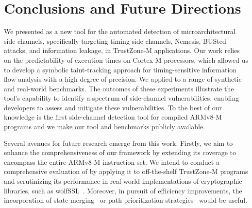 \section{Conclusions and Future Directions}

We presented \tool{} as a new tool for the automated detection of
microarchitectural side channels, specifically targeting timing side
channels, Nemesis, BUSted attacks, and information leakage, in TrustZone-M
applications. Our work relies on the predictability of execution times on
Cortex-M processors, which allowed us to develop a symbolic taint-tracking
approach for timing-sensitive information flow analysis with a high degree
of precision. We applied \tool{} to a range of synthetic and real-world
benchmarks. The outcomes of these experiments illustrate the tool's
capability to identify a spectrum of side-channel vulnerabilities, enabling
developers to assess and mitigate these vulnerabilities. To the best of our
knowledge \tool{} is the first side-channel detection tool for compiled
ARMv8-M programs and we make our tool and benchmarks publicly available.

Several avenues for future research emerge from this work. Firstly, we aim
to enhance the comprehensiveness of our framework by extending its coverage
to encompass the entire ARMv8-M instruction set. We intend to conduct a
comprehensive evaluation of \tool{} by applying it to off-the-shelf
TrustZone-M programs and scrutinizing its performance in real-world
implementations of cryptographic libraries, such as wolfSSL~\cite{wolfssl}.
Moreover, in pursuit of efficiency improvements, the incorporation of
state-merging~\cite{kuznetsov2012efficient} or path prioritization
strategies~\cite{baldoni2018survey, li2013steering} would be useful.

